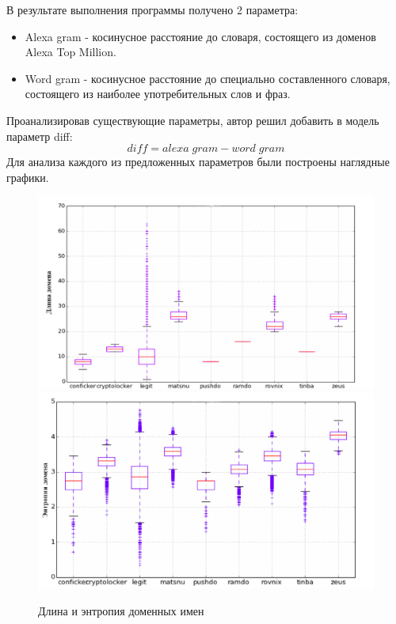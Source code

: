 В результате выполнения программы получено 2 параметра:
    \begin{itemize}
    \item Alexa gram - косинусное расстояние до словаря, состоящего из доменов Alexa Top Million.
    \item Word gram - косинусное расстояние до специально составленного словаря, состоящего из наиболее употребительных слов и фраз.
    \end{itemize}
    Проанализировав существующие параметры, автор решил добавить в модель параметр diff:
    \begin{equation}
    diff = alexa\;gram-word\;gram
    \end{equation}
    Для анализа каждого из предложенных параметров были построены наглядные графики.
    \begin{figure}[H]
        \left
        \includegraphics[width=0.5\linewidth]{images/linear_class/length.png}
        \right
        \includegraphics[width=0.5\linewidth]{images/linear_class/entropy.png} \label{length_entropy}
        \caption{Длина и энтропия доменных имен}
    \end{figure}
